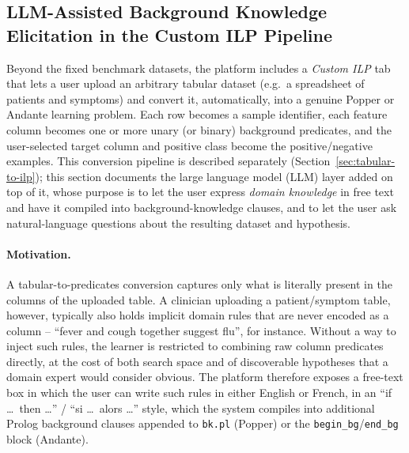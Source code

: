 \subsection{LLM-Assisted Background Knowledge Elicitation in the Custom ILP Pipeline}
\label{sec:custom-ilp-llm}

Beyond the fixed benchmark datasets, the platform includes a
\textit{Custom ILP} tab that lets a user upload an arbitrary tabular
dataset (e.g.\ a spreadsheet of patients and symptoms) and convert it,
automatically, into a genuine Popper or Andante learning problem. Each
row becomes a sample identifier, each feature column becomes one or
more unary (or binary) background predicates, and the user-selected
target column and positive class become the positive/negative
examples. This conversion pipeline is described separately
(Section~\ref{sec:tabular-to-ilp}); this section documents the large
language model (LLM) layer added on top of it, whose purpose is to let
the user express \emph{domain knowledge} in free text and have it
compiled into background-knowledge clauses, and to let the user ask
natural-language questions about the resulting dataset and hypothesis.

\paragraph{Motivation.} A tabular-to-predicates conversion captures only
what is literally present in the columns of the uploaded table. A
clinician uploading a patient/symptom table, however, typically also
holds implicit domain rules that are never encoded as a column --
``fever and cough together suggest flu'', for instance. Without a way
to inject such rules, the learner is restricted to combining raw
column predicates directly, at the cost of both search space and of
discoverable hypotheses that a domain expert would consider obvious.
The platform therefore exposes a free-text box in which the user can
write such rules in either English or French, in an ``if \ldots\ then
\ldots'' / ``si \ldots\ alors \ldots'' style, which the system compiles
into additional Prolog background clauses appended to \texttt{bk.pl}
(Popper) or the \texttt{begin\_bg}/\texttt{end\_bg} block (Andante).

